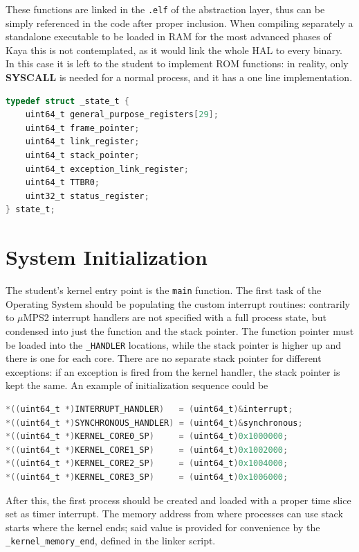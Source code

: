 \documentclass[12pt,a4paper,openright,twoside]{report}
\begin{document}
These functions are linked in the {\tt .elf} of the abstraction layer, thus can
be simply referenced in the code after proper inclusion. When compiling separately a
standalone executable to be loaded in RAM for the most advanced phases of Kaya
this is not contemplated, as it would link the whole HAL to every binary.
In this case it is left to the student to implement ROM functions: in reality, only
\textbf{SYSCALL} is needed for a normal process, and it has a one line implementation.

\begin{lstlisting}[label={lst:state},caption={Process state format},language=C]
typedef struct _state_t {
    uint64_t general_purpose_registers[29];
    uint64_t frame_pointer;
    uint64_t link_register;
    uint64_t stack_pointer;
    uint64_t exception_link_register;
    uint64_t TTBR0;
    uint32_t status_register;
} state_t;
\end{lstlisting}

\section{System Initialization}
The student's kernel entry point is the {\tt main} function. The first task of 
the Operating System should be populating the custom interrupt routines: contrarily 
to $\mu$MPS2 interrupt handlers are not specified with a full process state, but
condensed into just the function and the stack pointer. The function pointer must
be loaded into the {\tt \_HANDLER} locations, while the stack pointer is higher 
up and there is one for each core. There are no separate stack pointer for different
exceptions: if an exception is fired from the kernel handler, the stack pointer
is kept the same.
An example of initialization sequence could be
\begin{lstlisting}[language=C]
*((uint64_t *)INTERRUPT_HANDLER)   = (uint64_t)&interrupt;
*((uint64_t *)SYNCHRONOUS_HANDLER) = (uint64_t)&synchronous;
*((uint64_t *)KERNEL_CORE0_SP)     = (uint64_t)0x1000000;
*((uint64_t *)KERNEL_CORE1_SP)     = (uint64_t)0x1002000;
*((uint64_t *)KERNEL_CORE2_SP)     = (uint64_t)0x1004000;
*((uint64_t *)KERNEL_CORE3_SP)     = (uint64_t)0x1006000;
\end{lstlisting}

After this, the first process should be created and loaded with a proper time
slice set as timer interrupt. The memory address from where processes can use 
stack starts where the kernel ends; said value is provided for convenience by 
the {\tt \_kernel\_memory\_end}, defined in the linker script.
\end{document}
